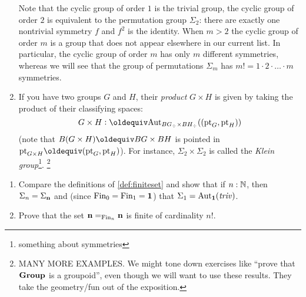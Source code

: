 \begin{example}
\begin{enumerate}
Note that the cyclic group of order $1$ is the trivial group, the cyclic group of order $2$ is equivalent to the permutation group $\Sigma_2$: there are exactly one nontrivial symmetry $f$ and $f^2$ is the identity.  When $m>2$ the cyclic group of order $m$ is a group that does not appear elsewhere in our current list.  In particular, the cyclic group of order $m$ has only $m$ different symmetries, whereas we will see that the group of permutations $\Sigma_m$ has $m!=1\cdot 2\cdot\dots\cdot m$ symmetries.
\item If you have two groups $G$ and $H$, their {\em product} $G\times H$ is given by taking the product of their classifying spaces:
$$G\times H\defequi\aut_{BG_\div\times BH_\div}((\pt_G,\pt_H))$$
(note that $B(G\times H)\oldequiv BG\times BH$ is pointed in $\pt_{G\times H}\oldequiv(\pt_G,\pt_H)$).  
For instance, $\Sigma_2\times\Sigma_2$ is called the {\em Klein group}\footnote{something about symmetries}.
\footnote{MANY MORE EXAMPLES.  We might tone down exercises like ``prove that $\mathbf{Group}$ is a groupoid'', even though we will want to use these results.  They take the geometry/fun out of the exposition.}
  \end{enumerate}
\end{example}
\begin{xca}
  \begin{enumerate}
  \item Compare the definitions of \cref{def:finiteset} and show that if $n:\mathbb{N}$, then $\Sigma_n=\Sigma_{\mathbf{n} }$ %
and (since $\operatorname{Fin}_0=\operatorname{Fin}_1=\mathbf{1}$) that $\Sigma_{1}=\mathrm{Aut}_{\mathbf{1} }(\mathop{\mathit{triv}})$.
\item Prove that the set $\mathbf{n} =_{\operatorname{Fin}_n}\mathbf{n} $ is finite of cardinality $n!$.
  \end{enumerate} 
\end{xca}


